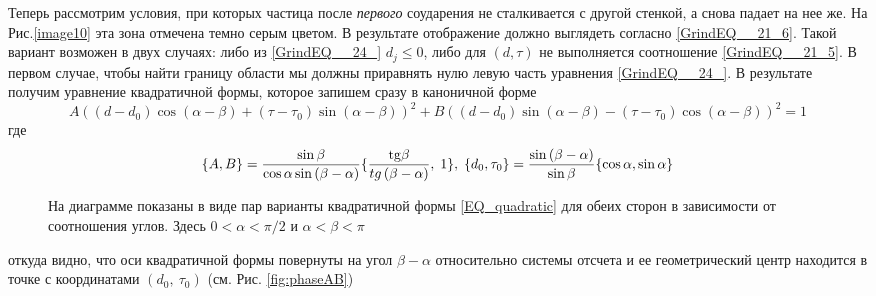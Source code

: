 \documentclass[a4paper]{article}
\begin{document}
Теперь рассмотрим условия, при которых частица после \textit{первого }соударения не сталкивается с другой стенкой, а снова падает на нее же. На Рис.\ref{image10} эта зона отмечена темно серым цветом. В результате отображение должно выглядеть согласно \eqref{GrindEQ__21_6}.
Такой вариант возможен в двух случаях: либо из \eqref{GrindEQ__24_} $d_{j} \le 0$, либо для $\left(d ,\tau \right)$ не выполняется соотношение \eqref{GrindEQ__21_5}. В первом случае, чтобы найти границу области мы должны приравнять нулю левую часть уравнения \eqref{GrindEQ__24_}. В результате получим уравнение квадратичной  формы, которое запишем сразу в каноничной форме
\begin{equation} \label{EQ_quadratic}
A{\left( {\left( {d - {d_0}} \right)\cos \left( {\alpha  - \beta } \right) + \left( {\tau  - {\tau _0}} \right)\sin \left( {\alpha  - \beta } \right)} \right)^2} + B{\left( {\left( {d - {d_0}} \right)\sin \left( {\alpha  - \beta } \right) - \left( {\tau  - {\tau _0}} \right)\cos \left( {\alpha  - \beta } \right)} \right)^2} = 1
\end{equation}
где 
\begin{equation} \label{GrindEQ__26_2}
\{ A,B\}  = \frac{{\sin \beta }}{{\cos \alpha \sin \left( {\beta  - \alpha } \right)}}\{ \frac{{{\mathop{\rm tg}\nolimits} \beta }}{{tg\left( {\beta  - \alpha } \right)}},\;1\} ,\;\{ {d_0},{\tau _0}\}  = \frac{{\sin \left( {\beta  - \alpha } \right)}}{{\sin \beta }}\{ \cos \alpha ,\sin \alpha \}
\end{equation}
\begin{figure}[h]
\caption{На диаграмме показаны в виде пар варианты квадратичной формы \eqref{EQ_quadratic} для обеих сторон в зависимости от соотношения углов. Здесь $0<\alpha<\pi/2$ и $\alpha<\beta<\pi$}
\label{fig:quadratic}
\end{figure}
откуда видно, что оси квадратичной формы повернуты на угол $\beta-\alpha$ относительно системы отсчета и ее геометрический центр находится в точке с координатами $\left(d_{0},\:\tau_{0}\right)$ (см. Рис. \ref{fig:phaseAB})
\end{document}
